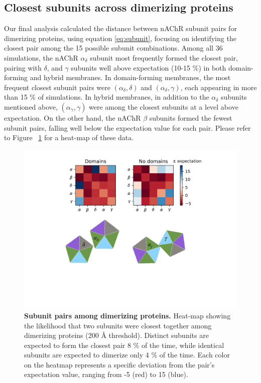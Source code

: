 \documentclass[final,3p,times,twocolumn]{elsarticle}
\begin{document}
\subsection{Closest subunits across dimerizing proteins}
Our final analysis calculated the distance between nAChR subunit pairs for dimerizing proteins, using equation \ref{eq:subunit}, focusing on identifying the closest pair among the 15 possible subunit combinations. Among all 36 simulations, the nAChR $\alpha_{\delta}$ subunit most frequently formed the closest pair, pairing with $\delta$, and $\gamma$ subunits well above expectation (10-15 \%) in both domain-forming and hybrid membranes. In domain-forming membranes, the most frequent closest subunit pairs were $(\alpha_\delta, \delta)$ and $(\alpha_\delta, \gamma)$, each appearing in more than 15 \% of simulations. In hybrid membranes, in addition to the $\alpha_{\delta}$ subunits mentioned above, $(\alpha_\gamma, \gamma)$ were among the closest subunits at a level above expectation. On the other hand, the nAChR $\beta$ subunits formed the fewest subunit pairs, falling well below the expectation value for each pair. Please refer to Figure ~\ref{fig:Figure7} for a heat-map of these data.   


\begin{figure}[H]
	\center
	\includegraphics[width=1.0\linewidth, trim={3cm 8cm 3cm 8cm}]{Figure4}
\caption[Subunit pairs among dimerizing proteins]{{\bf Subunit pairs among dimerizing proteins.} Heat-map showing the likelihood that two subunits were closest together among dimerizing proteins (200 {\AA} threshold). Distinct subunits are expected to form the closest pair 8 \% of the time, while identical subunits are expected to dimerize only 4 \% of the time. Each color on the heatmap represents a specific deviation from the pair's expectation value, ranging from -5 (red) to 15 (blue).  }
\label{fig:Figure7}
\end{figure}
\end{document}
